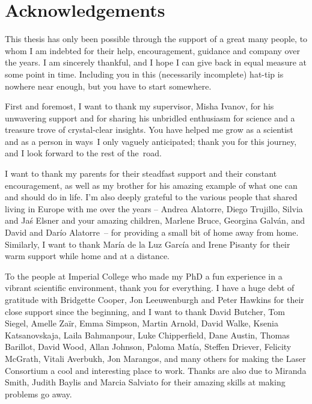 


\chapter*{Acknowledgements}
\noindent

\newlength{\ackskip}
\setlength{\ackskip}{8pt}


\noindent
This thesis has only been possible through the support of a great many people, to whom I am indebted for their help, encouragement, guidance and company over the years. I am sincerely thankful, and I hope I can give back in equal measure at some point in time. Including you in this (necessarily incomplete) hat-tip is nowhere near enough, but you have to start somewhere.

\vspace{\ackskip}
\noindent
First and foremost, I want to thank my supervisor, Misha Ivanov, for his unwavering support and for sharing his unbridled enthusiasm for science and a treasure trove of crystal-clear insights. You have helped me grow as a scientist and as a person in ways~I only vaguely anticipated; thank you for this journey, and I look forward to the rest of the~road.

\vspace{\ackskip}
\noindent
I want to thank my parents for their steadfast support and their constant encouragement, as well as my brother for his amazing example of what one can and should do in life. I'm also deeply grateful to the various people that shared living in Europe with me over the years -- Andrea Alatorre, Diego Trujillo, Silvia and Ja\'s Elsner and your amazing children, Marlene Bruce, Georgina Galván, and David and Darío Alatorre~-- for providing a small bit of home away from home. Similarly, I want to thank María de la Luz García and Irene Pisanty for their warm support while home and at a distance.


\vspace{\ackskip}
\noindent
To the people at Imperial College who made my PhD a fun experience in a vibrant scientific environment, thank you for everything. I have a huge debt of gratitude with Bridgette Cooper, Jon Leeuwenburgh and Peter Hawkins for their close support since the beginning, and I want to thank David Butcher, Tom Siegel, Amelle Za\"ir, Emma Simpson, Martin Arnold, David Walke, Ksenia Katsanovskaja, Laila Bahmanpour, Luke Chipperfield, Dane Austin, Thomas Barillot, David Wood, Allan Johnson, Paloma Matía, Steffen Driever, Felicity McGrath, Vitali Averbukh, Jon Marangos, and many others for making the Laser Consortium a cool and interesting place to work. Thanks are also due to Miranda Smith, Judith Baylis and Marcia Salviato for their amazing skills at making problems go away.

